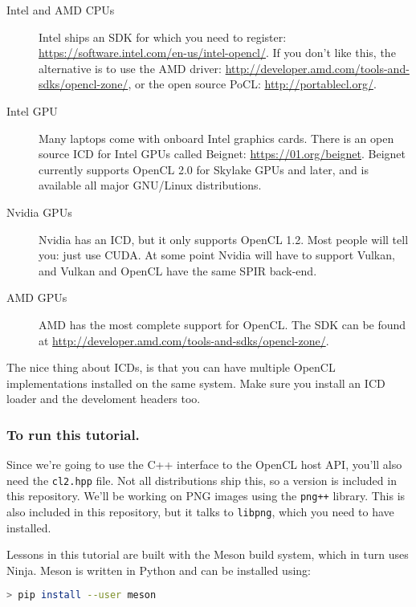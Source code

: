 \documentclass{article}
\begin{document}
    \begin{description}
      \item[Intel and \acs{AMD} \acsp{CPU}] Intel ships an \acs{SDK} for which you need to register: \url{https://software.intel.com/en-us/intel-opencl/}. If you don't like this, the alternative is to use the \acs{AMD} driver: \url{http://developer.amd.com/tools-and-sdks/opencl-zone/}, or the open source \acf{PoCL}: \url{http://portablecl.org/}.
      \item[Intel \acs{GPU}] Many laptops come with onboard Intel graphics cards. There is an open source \acs{ICD} for Intel \acp{GPU} called Beignet: \url{https://01.org/beignet}. Beignet currently supports OpenCL 2.0 for Skylake \acp{GPU} and later, and is available all major \acs{GNU}/Linux distributions.
      \item[Nvidia \acsp{GPU}] Nvidia has an \acs{ICD}, but it only supports OpenCL 1.2. Most people will tell you: just use \ac{CUDA}. At some point Nvidia will have to support Vulkan, and Vulkan and \ac{OpenCL} have the same \ac{SPIR} back-end.
      \item[\acs{AMD} \acsp{GPU}] \acs{AMD} has the most complete support for \ac{OpenCL}. The \ac{SDK} can be found at \url{http://developer.amd.com/tools-and-sdks/opencl-zone/}.
    \end{description}

  The nice thing about \acsp{ICD}, is that you can have multiple \ac{OpenCL} implementations installed on the same system. Make sure you install an \ac{ICD} loader and the develoment headers too.

  \subsubsection{To run this tutorial.}
  Since we're going to use the C++ interface to the \ac{OpenCL} host \acs{API}, you'll also need the {\tt cl2.hpp} file. Not all distributions ship this, so a version is included in this repository. We'll be working on \ac{PNG} images using the {\tt png++} library. This is also included in this repository, but it talks to {\tt libpng}, which you need to have installed.

  Lessons in this tutorial are built with the Meson build system, which in turn uses Ninja. Meson is written in Python and can be installed using:

  \begin{lstlisting}[language=bash]
  > pip install --user meson
  \end{lstlisting}
\end{document}
